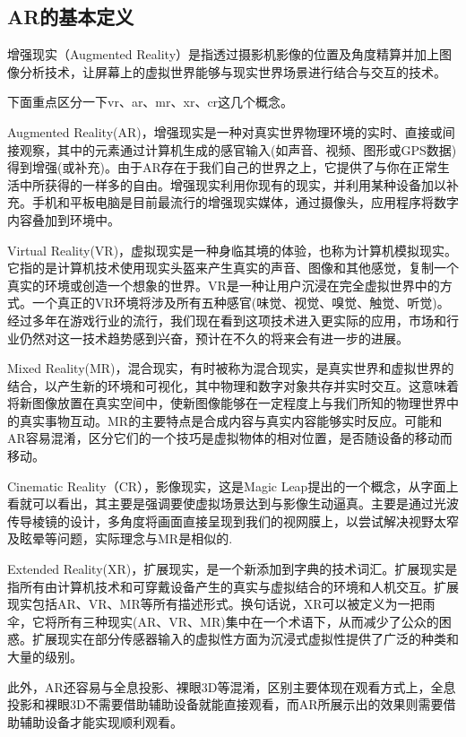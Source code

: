 \documentclass{article}
\begin{document}
\subsection{AR的基本定义}
增强现实（Augmented Reality）是指透过摄影机影像的位置及角度精算并加上图像分析技术，让屏幕上的虚拟世界能够与现实世界场景进行结合与交互的技术。\par
下面重点区分一下vr、ar、mr、xr、cr这几个概念。\par
Augmented Reality(AR)，增强现实是一种对真实世界物理环境的实时、直接或间接观察，其中的元素通过计算机生成的感官输入(如声音、视频、图形或GPS数据)得到增强(或补充)。由于AR存在于我们自己的世界之上，它提供了与你在正常生活中所获得的一样多的自由。增强现实利用你现有的现实，并利用某种设备加以补充。手机和平板电脑是目前最流行的增强现实媒体，通过摄像头，应用程序将数字内容叠加到环境中。\par
Virtual Reality(VR)，虚拟现实是一种身临其境的体验，也称为计算机模拟现实。它指的是计算机技术使用现实头盔来产生真实的声音、图像和其他感觉，复制一个真实的环境或创造一个想象的世界。VR是一种让用户沉浸在完全虚拟世界中的方式。一个真正的VR环境将涉及所有五种感官(味觉、视觉、嗅觉、触觉、听觉)。经过多年在游戏行业的流行，我们现在看到这项技术进入更实际的应用，市场和行业仍然对这一技术趋势感到兴奋，预计在不久的将来会有进一步的进展。\par
Mixed Reality(MR)，混合现实，有时被称为混合现实，是真实世界和虚拟世界的结合，以产生新的环境和可视化，其中物理和数字对象共存并实时交互。这意味着将新图像放置在真实空间中，使新图像能够在一定程度上与我们所知的物理世界中的真实事物互动。MR的主要特点是合成内容与真实内容能够实时反应。可能和AR容易混淆，区分它们的一个技巧是虚拟物体的相对位置，是否随设备的移动而移动。\par
Cinematic Reality（CR），影像现实，这是Magic Leap提出的一个概念，从字面上看就可以看出，其主要是强调要使虚拟场景达到与影像生动逼真。主要是通过光波传导棱镜的设计，多角度将画面直接呈现到我们的视网膜上，以尝试解决视野太窄及眩晕等问题，实际理念与MR是相似的.\par
Extended Reality(XR)，扩展现实，是一个新添加到字典的技术词汇。扩展现实是指所有由计算机技术和可穿戴设备产生的真实与虚拟结合的环境和人机交互。扩展现实包括AR、VR、MR等所有描述形式。换句话说，XR可以被定义为一把雨伞，它将所有三种现实(AR、VR、MR)集中在一个术语下，从而减少了公众的困惑。扩展现实在部分传感器输入的虚拟性方面为沉浸式虚拟性提供了广泛的种类和大量的级别。\par
此外，AR还容易与全息投影、裸眼3D等混淆，区别主要体现在观看方式上，全息投影和裸眼3D不需要借助辅助设备就能直接观看，而AR所展示出的效果则需要借助辅助设备才能实现顺利观看。\par
\end{document}
